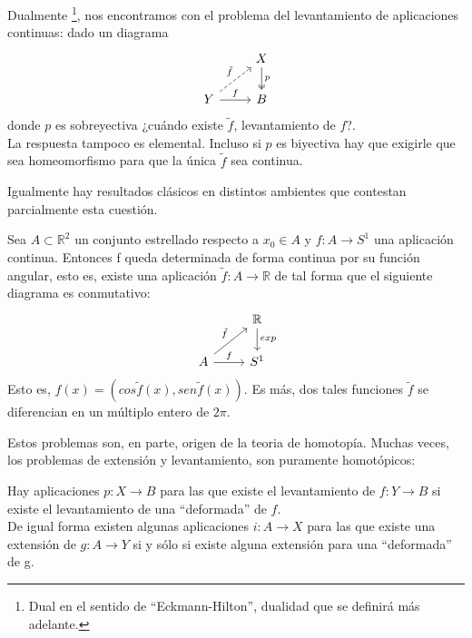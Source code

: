 Dualmente \footnote{Dual en el sentido de ``Eckmann-Hilton'', dualidad que se definirá más adelante.},
nos encontramos con el problema del levantamiento de aplicaciones continuas: dado un diagrama
$$
\begin{tikzcd}
	{}	& X \dar[two heads]{p} \\
	Y \urar[dashed]{\tilde{f}} \rar{f} & B
\end{tikzcd}
$$
donde $p$ es sobreyectiva ¿cuándo existe $\tilde{f}$, levantamiento de $f$?.\\ 
La respuesta tampoco es elemental. Incluso si $p$ es biyectiva hay que exigirle que sea homeomorfismo para que la única $\tilde{f}$ sea continua.\par

Igualmente hay resultados clásicos en distintos ambientes que contestan parcialmente esta cuestión.

\begin{teor} 
Sea $A \subset \mathbb{R}^2$ un conjunto estrellado respecto a $x_{0} \in A$ y $f : A \rightarrow S^{1}$ una aplicación continua. Entonces f queda determinada de forma continua por su función angular, esto es, existe una aplicación $\tilde{f} : A \rightarrow \mathbb{R}$ de tal forma que el siguiente diagrama es conmutativo:
$$
\begin{tikzcd}
	{}	& \mathbb{R} \dar{exp} \\
	A \urar{\tilde{f}} \rar{f} & S^1
\end{tikzcd}
$$
Esto es, $f(x) = (cos\tilde{f}(x), sen\tilde{f}(x))$. Es más, dos tales funciones $\tilde{f}$ se diferencian en un múltiplo entero de $2\pi$.
\end{teor}

Estos problemas son, en parte, origen de la teoria de homotopía. Muchas veces, los problemas de extensión y levantamiento, son puramente homotópicos: \par

Hay aplicaciones $p : X \rightarrow B$ para las que existe el levantamiento de $f : Y \rightarrow B$ si existe el levantamiento de una ``deformada'' de $f$. \\

De igual forma existen algunas aplicaciones $i : A \rightarrow X$ para las que existe una extensión de $g : A \rightarrow Y$ si y sólo si existe alguna extensión para una ``deformada'' de g. \par

